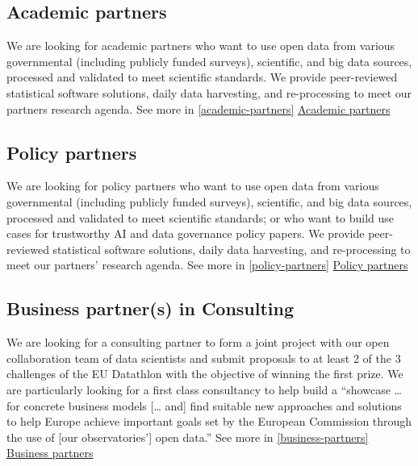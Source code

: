 \documentclass[
  a4paper,
  openany, a4paper, oneside]{book}
\begin{document}
\hypertarget{intro-academic-partners}{%
\subsection*{Academic partners}\label{intro-academic-partners}}

We are looking for academic partners who want to use open data from various governmental (including publicly funded surveys), scientific, and big data sources, processed and validated to meet scientific standards. We provide peer-reviewed statistical software solutions, daily data harvesting, and re-processing to meet our partners research agenda. See more in \ref{academic-partners} \protect\hyperlink{academic-partners}{Academic partners}

\hypertarget{intro-policy-partners}{%
\subsection*{Policy partners}\label{intro-policy-partners}}

We are looking for policy partners who want to use open data from various governmental (including publicly funded surveys), scientific, and big data sources, processed and validated to meet scientific standards; or who want to build use cases for trustworthy AI and data governance policy papers. We provide peer-reviewed statistical software solutions, daily data harvesting, and re-processing to meet our partners' research agenda. See more in \ref{policy-partners} \protect\hyperlink{policy-partners}{Policy partners}

\hypertarget{intro-business-partners}{%
\subsection*{Business partner(s) in Consulting}\label{intro-business-partners}}

We are looking for a consulting partner to form a joint project with our open collaboration team of data scientists and submit proposals to at least 2 of the 3 challenges of the EU Datathlon with the objective of winning the first prize. We are particularly looking for a first class consultancy to help build a ``showcase \ldots{} for concrete business models {[}\ldots{} and{]} find suitable new approaches and solutions to help Europe achieve important goals set by the European Commission through the use of {[}our observatories'{]} open data.'' See more in \ref{business-partners} \protect\hyperlink{business-partners}{Business partners}
\end{document}
